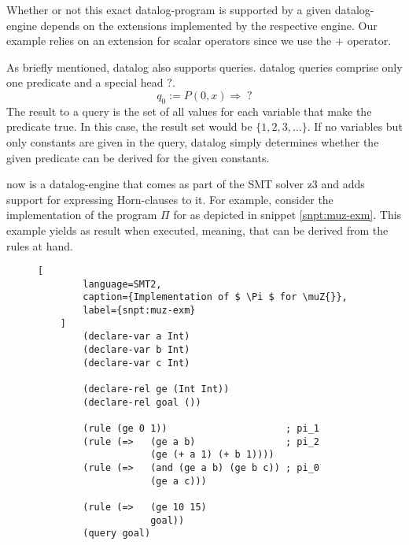 Whether or not this exact \gls{datalog}-program is supported by a given \gls{datalog}-engine depends on the extensions implemented by the respective engine.
Our example relies on an extension for scalar operators since we use the $ + $ operator.

As briefly mentioned, \gls{datalog} also supports queries.
\gls{datalog} queries comprise only one predicate and a special head $ ? $.
\begin{equation*}
    q_0 := P(0, x) \Rightarrow \; ?
\end{equation*}
The result to a query is the set of all values for each variable that make the predicate true.
In this case, the result set would be $ \{ 1, 2, 3, \dots \} $.
If no variables but only constants are given in the query, \gls{datalog} simply determines whether the given predicate can be derived for the given constants.

\muZ{} now is a \gls{datalog}-engine that comes as part of the SMT solver z3 \cite{Moura08} and adds support for expressing Horn-clauses to it.
For example, consider the implementation of the program $ \Pi $ for \muZ{} as depicted in snippet \ref{snpt:muz-exm}.
This example yields  as result when executed, meaning, that  can be derived from the rules at hand.

\begin{figure}
    \begin{lstlisting}[
        language=SMT2,
        caption={Implementation of $ \Pi $ for \muZ{}},
        label={snpt:muz-exm}
    ]
        (declare-var a Int)
        (declare-var b Int)
        (declare-var c Int)

        (declare-rel ge (Int Int))
        (declare-rel goal ())

        (rule (ge 0 1))                     ; pi_1
        (rule (=>   (ge a b)                ; pi_2
                    (ge (+ a 1) (+ b 1))))
        (rule (=>   (and (ge a b) (ge b c)) ; pi_0
                    (ge a c)))

        (rule (=>   (ge 10 15)
                    goal))
        (query goal)
    \end{lstlisting}
\end{figure}

